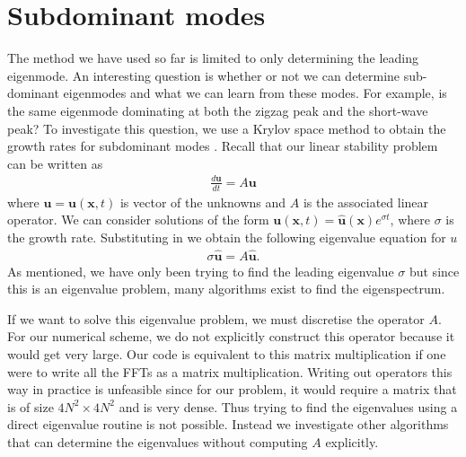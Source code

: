 \section{Subdominant modes}
The method we have used so far is limited to only determining the leading eigenmode. An interesting question is whether or not we can determine sub-dominant eigenmodes and what we can learn from these modes. For example, is the same eigenmode dominating at both the zigzag peak and the short-wave peak? To investigate this question, we use a Krylov space method to obtain the growth rates for subdominant modes \cite{edwards1994}. Recall that our linear stability problem can be written as 
\begin{align}
\frac{d\bm{u}}{dt} = A\bm{u}
\end{align}
where $\bm{u}=\bm{u}(\bm{x},t)$ is vector of the unknowns and $A$ is the associated linear operator. We can consider solutions of the form $\bm{u}(\bm{x},t)=\hat{\bm{u}}(\bm{x})e^{\sigma t}$, where $\sigma$ is the growth rate. Substituting in we obtain the following eigenvalue equation for $u$
\begin{align}
\sigma \hat{\bm{u}} = A\hat{\bm{u}}.
\end{align}
As mentioned, we have only been trying to find the leading eigenvalue $\sigma$ but since this is an eigenvalue problem, many algorithms exist to find the eigenspectrum. 

If we want to solve this eigenvalue problem, we must discretise the operator $A$. For our numerical scheme, we do not explicitly construct this operator because it would get very large. Our code is equivalent to this matrix multiplication if one were to write all the FFTs as a matrix multiplication. Writing out operators this way in practice is unfeasible since for our problem, it would require a matrix that is of size $4N^{2}\times 4N^{2}$ and is very dense. Thus trying to find the eigenvalues using a direct eigenvalue routine is not possible. Instead we investigate other algorithms that can determine the eigenvalues without computing $A$ explicitly. 

